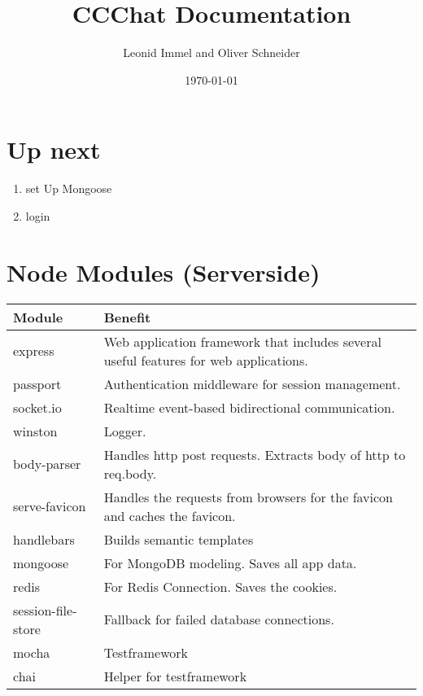 \documentclass[10pt,a4paper,landscape]{article}
\title{CCChat Documentation}
\date{\today}
\author{Leonid Immel and Oliver Schneider}
\begin{document}
\maketitle
\tableofcontents

\section{Up next}
\begin{enumerate}
        \item
                set Up Mongoose
        \item
                login
\end{enumerate}

\section{Node Modules (Serverside)}
\begin{tabularx}{\textwidth}{ll}
    \textbf{Module} & \textbf{Benefit}               \\
    \toprule
    express         & Web application framework that includes several useful features for web applications. \\ 
    \midrule
    passport        & Authentication middleware for session management. \\
    \midrule
    socket.io       & Realtime event-based bidirectional communication. \\
    \midrule
    winston         & Logger. \\
    \midrule
    body-parser     & Handles http post requests. Extracts body of http to req.body. \\
    \midrule
    serve-favicon   & Handles the requests from browsers for the favicon and caches the favicon. \\
    \midrule
    handlebars      & Builds semantic templates \\
    \midrule
    mongoose        & For MongoDB modeling. Saves all app data. \\
    \midrule
    redis           & For Redis Connection. Saves the cookies. \\
    \midrule
    session-file-store & Fallback for failed database connections.\\
    \midrule
    mocha           & Testframework \\
    \midrule
    chai            & Helper for testframework \\
    \bottomrule
\end{tabularx}
\end{document}
